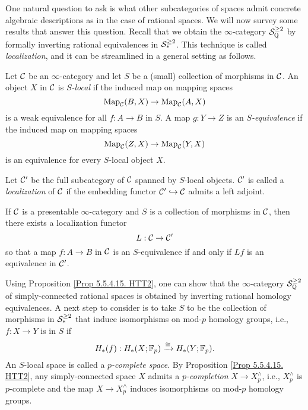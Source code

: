 One natural question to ask is what other subcategories of spaces admit concrete algebraic descriptions as in the case of rational spaces.
We will now survey some results that answer this question.
Recall that we obtain the $\infty$-category ${\mathcal{S}}^{\geq 2}_{{\mathbb{Q}}}$ by formally inverting rational equivalences in ${\mathcal{S}}^{\geq 2}_{*}$. This technique is called \emph{localization}, and it can be streamlined in a general setting as follows.
\begin{definition}
\label{localization}
Let ${\mathcal{C}}$ be an $\infty$-category and let $S$ be a (small) collection of morphisms in ${\mathcal{C}}$. 
An object $X$ in ${\mathcal{C}}$ is \emph{$S$-local} if the induced map on mapping spaces
$$
\operatorname{Map}_{{\mathcal{C}}}(B, X) \to \operatorname{Map}_{{\mathcal{C}}}(A, X)
$$
is a weak equivalence for all $f:A \to B$ in $S$. A map $g:Y \to Z$ is an \emph{$S$-equivalence} if the induced map on mapping spaces
$$
\operatorname{Map}_{{\mathcal{C}}}(Z, X) \to \operatorname{Map}_{{\mathcal{C}}}(Y, X)
$$
is an equivalence for every $S$-local object $X$.
\end{definition}
Let ${\mathcal{C}}'$ be the full subcategory of ${\mathcal{C}}$ spanned by $S$-local objects. ${\mathcal{C}}'$ is called a \emph{localization} of ${\mathcal{C}}$ if the embedding functor ${\mathcal{C}}' \hookrightarrow {\mathcal{C}}$ admits a left adjoint.
\begin{proposition}
\cite[Proposition 5.5.4.15.]{HTT}
\label{Prop 5.5.4.15. HTT2}
If ${\mathcal{C}}$ is a presentable $\infty$-category and $S$ is a collection of morphisms in ${\mathcal{C}}$, then there exists a localization functor
$$
L:{\mathcal{C}} \to {\mathcal{C}}'
$$
so that a map $f:A\to B$ in ${\mathcal{C}}$ is an $S$-equivalence if and only if $Lf$ is an equivalence in ${\mathcal{C}}'$.
\end{proposition}

Using Proposition \ref{Prop 5.5.4.15. HTT2}, one can show that the $\infty$-category ${\mathcal{S}}^{\geq 2}_{{\mathbb{Q}}}$ of simply-connected rational spaces is obtained by inverting rational homology equivalences. 
A next step to consider is to take 
$S$ to be the collection of morphisms in ${\mathcal{S}}^{\geq 2}_*$ that induce isomorphisms on mod-$p$ homology groups, i.e., $f: X \to Y$ is in $S$ if 
$$
H_*(f):H_{*}(X;{\mathbb{F}}_p) \xrightarrow{\cong} H_*(Y; {\mathbb{F}}_p).
$$
An $S$-local space is called a \emph{$p$-complete space}. By Proposition \ref{Prop 5.5.4.15. HTT2}, any simply-connected space $X$ admits a
\emph{$p$-completion} $X \to X^{\wedge}_p$, i.e., $X^{\wedge}_p$ is $p$-complete and the map $X \to X^{\wedge}_p$ induces isomorphisms on mod-$p$ homology groups.

